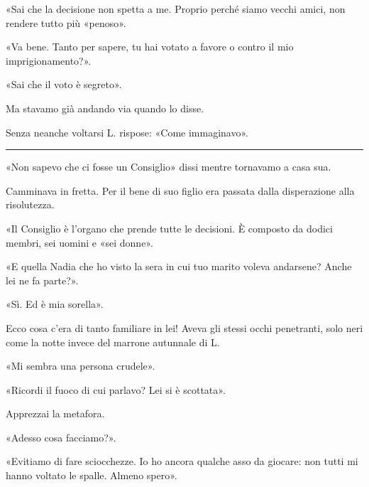 «Sai che la decisione non spetta a me. Proprio perché siamo vecchi amici, non rendere tutto più
«penoso».

«Va bene. Tanto per sapere, tu hai votato a favore o contro il mio imprigionamento?».

«Sai che il voto è segreto».

Ma stavamo già andando via quando lo disse.

Senza neanche voltarsi L. rispose: «Come immaginavo».

\plainbreak{1}

«Non sapevo che ci fosse un Consiglio» dissi mentre tornavamo a casa sua.

Camminava in fretta. Per il bene di suo figlio era passata dalla disperazione alla risolutezza.

«Il Consiglio è l'organo che prende tutte le decisioni. È composto da dodici membri, sei uomini e
«sei donne».

«E quella Nadia che ho visto la sera in cui tuo marito voleva andarsene? Anche lei ne fa parte?».

«Sì. Ed è mia sorella».

Ecco cosa c'era di tanto familiare in lei! Aveva gli stessi occhi penetranti, solo neri come la
notte invece del marrone autunnale di L.

«Mi sembra una persona crudele».

«Ricordi il fuoco di cui parlavo? Lei si è scottata».

Apprezzai la metafora.

«Adesso cosa facciamo?».

«Evitiamo di fare sciocchezze. Io ho ancora qualche asso da giocare: non tutti mi hanno voltato le
spalle. Almeno spero».
